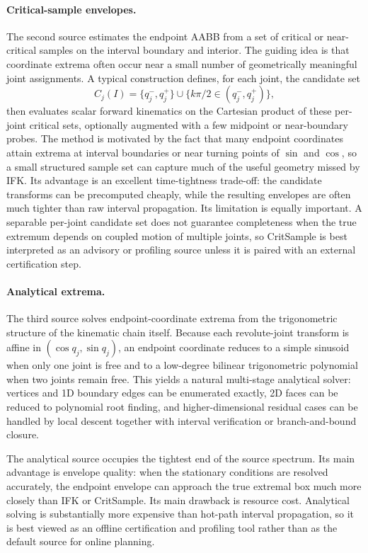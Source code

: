 \documentclass[journal]{IEEEtran}
\begin{document}
\paragraph{Critical-sample envelopes.}
The second source estimates the endpoint AABB from a set of critical or
near-critical samples on the interval boundary and interior. The guiding idea is
that coordinate extrema often occur near a small number of geometrically
meaningful joint assignments. A typical construction defines, for each joint,
the candidate set
\[
C_j(I) = \{q_j^-, q_j^+\} \cup \{k\pi/2 \in (q_j^-, q_j^+)\},
\]
then evaluates scalar forward kinematics on the Cartesian product of these
per-joint critical sets, optionally augmented with a few midpoint or
near-boundary probes. The method is motivated by the fact that many endpoint
coordinates attain extrema at interval boundaries or near turning points of
$\sin$ and $\cos$, so a small structured sample set can capture much of the
useful geometry missed by IFK. Its advantage is an excellent time-tightness
trade-off: the candidate transforms can be precomputed cheaply, while the
resulting envelopes are often much tighter than raw interval propagation. Its
limitation is equally important. A separable per-joint candidate set does not
guarantee completeness when the true extremum depends on coupled motion of
multiple joints, so CritSample is best interpreted as an advisory or profiling
source unless it is paired with an external certification step.

\paragraph{Analytical extrema.}
The third source solves endpoint-coordinate extrema from the trigonometric
structure of the kinematic chain itself. Because each revolute-joint transform
is affine in $(\cos q_j,\sin q_j)$, an endpoint coordinate reduces to a simple
sinusoid when only one joint is free and to a low-degree bilinear
trigonometric polynomial when two joints remain free. This yields a natural
multi-stage analytical solver: vertices and 1D boundary edges can be enumerated
exactly, 2D faces can be reduced to polynomial root finding, and
higher-dimensional residual cases can be handled by local descent together with
interval verification or branch-and-bound closure.

The analytical source occupies the tightest end of the source spectrum. Its
main advantage is envelope quality: when the stationary conditions are resolved
accurately, the endpoint envelope can approach the true extremal box much more
closely than IFK or CritSample. Its main drawback is resource cost. Analytical
solving is substantially more expensive than hot-path interval propagation, so
it is best viewed as an offline certification and profiling tool rather than as
the default source for online planning.
\end{document}
